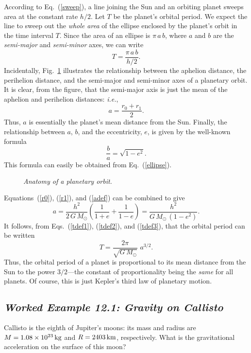 According to Eq.~(\ref{sweep}), a line joining the Sun and an orbiting planet sweeps area
at the constant rate $h/2$. Let $T$ be the planet's orbital period. We expect the line to
sweep out the {\em whole area} of the ellipse enclosed by the planet's orbit in the time
interval $T$. Since the area of an ellipse is $\pi\,a\,b$, where $a$ and $b$ are the
{\em semi-major} and {\em semi-minor} axes, we can write
\begin{equation}\label{tdef1}
T = \frac{\pi\,a\,b}{h/2}.
\end{equation}
Incidentally, Fig.~\ref{f108} illustrates the relationship between the aphelion distance, the
perihelion distance, and the semi-major and semi-minor axes of a planetary orbit. It is
clear, from the figure, that the semi-major axis is just the mean of the  aphelion and
perihelion distances: {\em i.e.},
\begin{equation}\label{adef}
a = \frac{r_0+r_1}{2}.
\end{equation}
Thus, $a$ is essentially the planet's mean distance from the Sun. Finally, the relationship between $a$, $b$,
and the eccentricity, $e$, is given by the well-known formula
\begin{equation}\label{tdef2}
\frac{b}{a} = \sqrt{1-e^2}.
\end{equation}
This formula can easily be obtained from Eq.~(\ref{ellipse}).

\begin{figure}
\epsfysize=1.5in
\centerline{}
\caption{\em Anatomy of a planetary orbit.}\label{f108}  
\end{figure}

Equations~(\ref{r0}), (\ref{r1}), and (\ref{adef}) can be combined to give
\begin{equation}\label{tdef3}
a = \frac{h^2}{2\,G\,M_\odot}\left(\frac{1}{1+e}+\frac{1}{1-e}\right) = \frac{h^2}{G\,M_\odot\,(1-e^2)}.
\end{equation}
It follows, from Eqs.~(\ref{tdef1}), (\ref{tdef2}), and (\ref{tdef3}), that the orbital period
can be written
\begin{equation}
T = \frac{2\pi}{\sqrt{G\,M_\odot}}\,\,a^{3/2}.
\end{equation}
Thus, the orbital period of a planet is proportional to its mean distance from the Sun to
the power $3/2$---the constant of proportionality being the {\em same} for all planets. Of course,
this is just Kepler's third law of planetary motion.

\subsection*{\em Worked Example 12.1: Gravity on Callisto}
 Callisto is the eighth of Jupiter's moons:  its  mass and radius are
 $M= 1.08\times 10^{23}\, {\rm kg}$ and $R= 2403  \,{\rm km}$, respectively. What is the gravitational
acceleration on the surface
of this moon?

